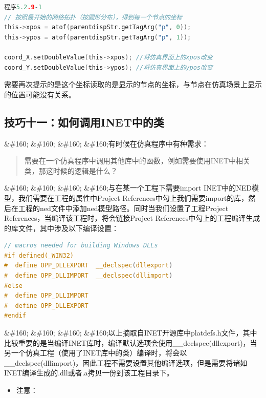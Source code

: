 \begin{lstlisting}[language=c]
程序5.2.9-1
// 按照最开始的网络拓扑（按圆形分布），得到每一个节点的坐标
this->xpos = atof(parentdispStr.getTagArg("p", 0));
this->ypos = atof(parentdispStr.getTagArg("p", 1));

coord_X.setDoubleValue(this->xpos); //将仿真界面上的xpos改变
coord_Y.setDoubleValue(this->ypos); //将仿真界面上的ypos改变

\end{lstlisting}

需要再次提示的是这个坐标读取的是显示的节点的坐标，与节点在仿真场景上显示的位置可能没有关系。

\subsection{技巧十一：如何调用INET中的类}
\label{技巧十一：如何调用inet中的类}

\&\#160; \&\#160; \&\#160; \&\#160;有时候在仿真程序中有种需求：

\begin{quote}
需要在一个仿真程序中调用其他库中的函数，例如需要使用INET中相关类，那这时候的逻辑是什么？
\end{quote}

\&\#160; \&\#160; \&\#160; \&\#160;与在某一个工程下需要import INET中的NED模型，我们需要在工程的属性中Project References中勾上我们需要import的库，然后在工程的ned文件中添加ned模型路径。同时当我们设置了工程Project References，当编译该工程时，将会链接Project References中勾上的工程编译生成的库文件，其中涉及以下编译设置：

\begin{lstlisting}[language=c]
// macros needed for building Windows DLLs
#if defined(_WIN32)
#  define OPP_DLLEXPORT  __declspec(dllexport)
#  define OPP_DLLIMPORT  __declspec(dllimport)
#else
#  define OPP_DLLIMPORT
#  define OPP_DLLEXPORT
#endif

\end{lstlisting}

\&\#160; \&\#160; \&\#160; \&\#160;以上摘取自INET开源库中platdefs.h文件，其中比较重要的是当编译INET库时，编译默认选项会使用\_\_declspec(dllexport)，当另一个仿真工程（使用了INET库中的类）编译时，将会以\_\_declspec(dllimport)，因此工程不需要设置其他编译选项，但是需要将诸如INET编译生成的.dll或者.a拷贝一份到该工程目录下。

\begin{itemize}
\item 注意：

\end{itemize}

